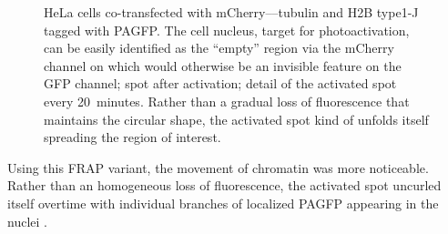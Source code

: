       \begin{figure}
        \centering
        \hfill
          {
            HeLa cells co-transfected with mCherry--\textalpha--tubulin and
            H2B type1-J tagged with PAGFP.
             The cell nucleus, target
            for photoactivation, can be easily identified as the ``empty''
            region via the mCherry channel on which would otherwise be an
            invisible feature on the GFP channel;
             spot after activation;
             detail of the
            activated spot every 20~minutes. Rather than a gradual loss of
            fluorescence that maintains the circular shape, the activated spot
            kind of unfolds itself spreading the region of interest.
          }
        \label{fig:kill-frap:ifrap}
      \end{figure}

      Using this FRAP variant, the movement of chromatin was more noticeable.
      Rather than an homogeneous loss of fluorescence, the activated
      spot uncurled itself overtime with individual branches of
      localized PAGFP appearing in the nuclei .
